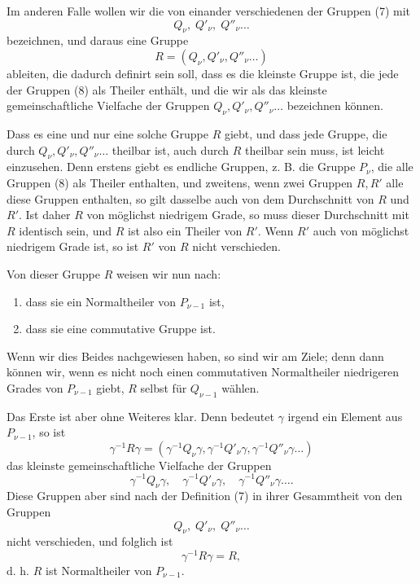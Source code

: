 \documentclass[11pt]{article}
\begin{document}
Im anderen Falle wollen wir die von einander verschiedenen der Gruppen (7) mit
\begin{equation}
Q_\nu,\;Q'_\nu,\;Q''_\nu\ldots
\tag{8}
\end{equation}
bezeichnen, und daraus eine Gruppe
\begin{equation}
R=(Q_\nu,Q'_\nu,Q''_\nu\ldots)
\tag{9}
\end{equation}
ableiten, die dadurch definirt sein soll, dass es die kleinste Gruppe ist, die jede der Gruppen (8) als Theiler enthält, und die wir als das kleinste gemeinschaftliche Vielfache der Gruppen $Q_\nu,Q'_\nu,Q''_\nu\ldots$ bezeichnen können.

Dass es eine und nur eine solche Gruppe $R$ giebt, und dass jede Gruppe, die durch $Q_\nu,Q'_\nu,Q''_\nu\ldots$ theilbar ist, auch durch $R$ theilbar sein muss, ist leicht einzusehen. Denn erstens giebt es endliche Gruppen, z. B. die Gruppe $P_\nu$, die alle Gruppen (8) als Theiler enthalten, und zweitens, wenn zwei Gruppen $R,R'$ alle diese Gruppen enthalten, so gilt dasselbe auch von dem Durchschnitt von $R$ und $R'$. Ist daher $R$ von möglichst niedrigem Grade, so muss dieser Durchschnitt mit $R$ identisch sein, und $R$ ist also ein Theiler von $R'$. Wenn $R'$ auch von möglichst niedrigem Grade ist, so ist $R'$ von $R$ nicht verschieden.

Von dieser Gruppe $R$ weisen wir nun nach:
\begin{enumerate}[label=\alph*)]
\item dass sie ein Normaltheiler von $P_{\nu-1}$ ist,
\item dass sie eine commutative Gruppe ist.
\end{enumerate}
Wenn wir dies Beides nachgewiesen haben, so sind wir am Ziele; denn dann können wir, wenn es nicht noch einen commutativen Normaltheiler niedrigeren Grades von $P_{\nu-1}$ giebt, $R$ selbst für $Q_{\nu-1}$ wählen.

Das Erste ist aber ohne Weiteres klar. Denn bedeutet $\gamma$ irgend ein Element aus $P_{\nu-1}$, so ist
\[
\gamma^{-1}R\gamma=(\gamma^{-1}Q_\nu\gamma,\gamma^{-1}Q'_\nu\gamma,\gamma^{-1}Q''_\nu\gamma\ldots)
\]
das kleinste gemeinschaftliche Vielfache der Gruppen
\[
\gamma^{-1}Q_\nu\gamma,
\quad \gamma^{-1}Q'_\nu\gamma,
\quad \gamma^{-1}Q''_\nu\gamma\ldots.
\]
Diese Gruppen aber sind nach der Definition (7) in ihrer Gesammtheit von den Gruppen
\[
Q_\nu,\;Q'_\nu,\;Q''_\nu\ldots
\]
nicht verschieden, und folglich ist
\[
\gamma^{-1}R\gamma=R,
\]
d. h. $R$ ist Normaltheiler von $P_{\nu-1}$.
\end{document}
